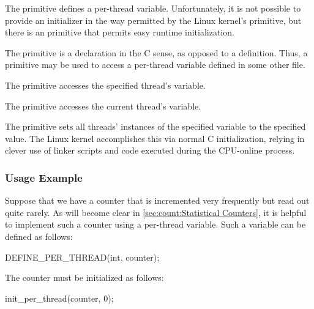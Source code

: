 \begin{description}[style=nextline]
\item[\tco{DEFINE_PER_THREAD()}]

The  primitive defines a per-thread variable.
Unfortunately, it is not possible to provide an initializer in the way
permitted by the Linux kernel's  primitive,
but there is an  primitive that permits easy
runtime initialization.

\item[\tco{DECLARE_PER_THREAD()}]
The  primitive is a declaration in the C sense,
as opposed to a definition.
Thus, a  primitive may be used to access
a per-thread variable defined in some other file.

\item[\tco{per_thread()}]
The  primitive accesses the specified thread's variable.

\item[\tco{__get_thread_var()}]
The  primitive accesses the current thread's variable.

\item[\tco{init_per_thread()}]
The  primitive sets all threads' instances of
the specified variable to the specified value.
The Linux kernel accomplishes this via normal C initialization,
relying in clever use of linker scripts and code executed during
the CPU-online process.

\end{description}

\subsubsection{Usage Example}

Suppose that we have a counter that is incremented very frequently
but read out quite rarely.
As will become clear in
\cref{sec:count:Statistical Counters},
it is helpful to implement such a counter using a per-thread variable.
Such a variable can be defined as follows:

\begin{VerbatimU}
DEFINE_PER_THREAD(int, counter);
\end{VerbatimU}

The counter must be initialized as follows:

\begin{VerbatimU}
init_per_thread(counter, 0);
\end{VerbatimU}

